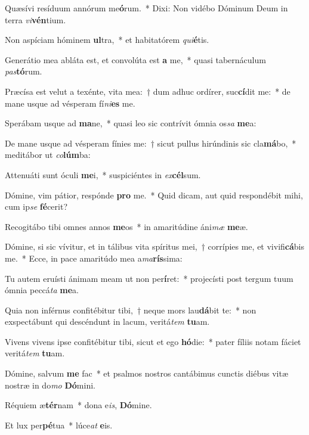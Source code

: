 \item Quæsívi resíduum annórum me\textbf{ó}rum.~* Dixi: Non vidébo Dóminum Deum in terra \textit{vi}\textbf{vén}tium.

\item Non aspíciam hóminem \textbf{ul}tra,~* et habitatórem \textit{qui}\textbf{é}tis.

\item Generátio mea abláta est, et convolúta est \textbf{a} me,~* quasi tabernáculum \textit{pas}\textbf{tó}rum.

\item Præcísa est velut a texénte, vita mea:~† dum adhuc ordírer, suc\textbf{cí}dit me:~* de mane usque ad vésperam fí\textit{ni}\textbf{es} me.

\item Sperábam usque ad \textbf{ma}ne,~* quasi leo sic contrívit ómnia os\textit{sa} \textbf{me}a:

\item De mane usque ad vésperam fínies me:~† sicut pullus hirúndinis sic cla\textbf{má}bo,~* meditábor ut \textit{co}\textbf{lúm}ba:

\item Attenuáti sunt óculi \textbf{me}i,~* suspiciéntes in \textit{ex}\textbf{cél}sum.

\item Dómine, vim pátior, respónde \textbf{pro} me.~* Quid dicam, aut quid respondébit mihi, cum ip\textit{se} \textbf{fé}cerit?

\item Recogitábo tibi omnes annos \textbf{me}os~* in amaritúdine áni\textit{mæ} \textbf{me}æ.

\item Dómine, si sic vívitur, et in tálibus vita spíritus mei,~† corrípies me, et vivifi\textbf{cá}bis me.~* Ecce, in pace amaritúdo mea a\textit{ma}\textbf{rís}sima:

\item Tu autem eruísti ánimam meam ut non per\textbf{í}ret:~* projecísti post tergum tuum ómnia peccá\textit{ta} \textbf{me}a.

\item Quia non inférnus confitébitur tibi,~† neque mors lau\textbf{dá}bit te:~* non exspectábunt qui descéndunt in lacum, veritá\textit{tem} \textbf{tu}am.

\item Vivens vivens ipse confitébitur tibi, sicut et ego \textbf{hó}die:~* pater fíliis notam fáciet veritá\textit{tem} \textbf{tu}am.

\item Dómine, salvum \textbf{me} fac~* et psalmos nostros cantábimus cunctis diébus vitæ nostræ in do\textit{mo} \textbf{Dó}mini.

\item Réquiem æ\textbf{tér}nam~* dona e\textit{is}, \textbf{Dó}mine.

\item Et lux per\textbf{pé}tua~* lúce\textit{at} \textbf{e}is.